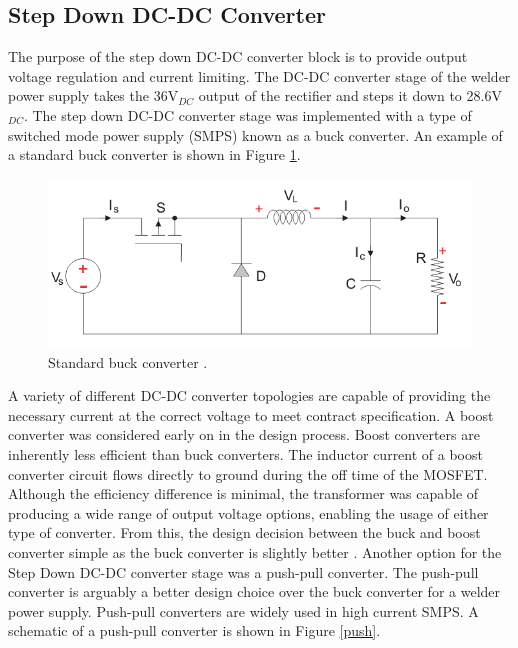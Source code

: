 \documentclass[11pt]{article}
\begin{document}
        
    \subsection{Step Down DC-DC Converter}
    The purpose of the step down DC-DC converter block is to provide output voltage regulation and current limiting. The DC-DC converter stage of the welder power supply takes the 36V$_{DC}$ output of the rectifier and steps it down to 28.6V$_{DC}$. The step down DC-DC converter stage was implemented with a type of switched mode power supply (SMPS) known as a buck converter. An example of a standard buck converter is shown in Figure \ref{buck}.
    
    \begin{figure}[H]
            \centering
            \includegraphics[width=0.6\linewidth]{1529672077.png}
            \caption{Standard buck converter \cite{electrics4u_group_standard_2019}.}
            \label{buck}
        \end{figure}
    
    \noindent A variety of different DC-DC converter topologies are capable of providing the necessary current at the correct voltage to meet contract specification. A boost converter was considered early on in the design process. Boost converters are inherently less efficient than buck converters. The inductor current of a boost converter circuit flows directly to ground during the off time of the MOSFET. Although the efficiency difference is minimal, the transformer was capable of producing a wide range of output voltage options, enabling the usage of either type of converter. From this, the design decision between the buck and boost converter simple as the buck converter is slightly better \cite{eric_coates_module_2018}.
    \newline
    \newline
    \noindent Another option for the Step Down DC-DC converter stage was a push-pull converter. The push-pull converter is arguably a better design choice over the buck converter for a welder power supply. Push-pull converters are widely used in high current SMPS. A schematic of a push-pull converter is shown in Figure \ref{push}.
    
\end{document}
